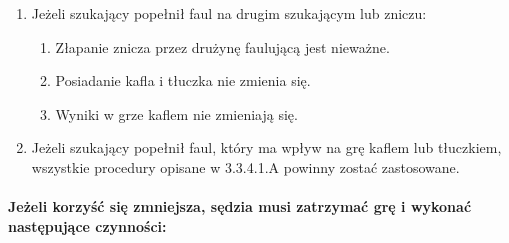 \documentclass[12pt]{article}
\begin{document}
\begin{enumerate}
	      \begin{enumerate}
		      \item
		            Jeżeli szukający popełnił faul na drugim szukającym lub zniczu:

		            \begin{enumerate}
			            \item
			                  Złapanie znicza przez drużynę faulującą jest nieważne.
			            \item
			                  Posiadanie kafla i tłuczka nie zmienia się.
			            \item
			                  Wyniki w grze kaflem nie zmieniają się.
		            \end{enumerate}
		      \item
		            Jeżeli szukający popełnił faul, który ma wpływ na grę kaflem lub
		            tłuczkiem, wszystkie procedury opisane w 3.3.4.1.A powinny zostać
		            zastosowane.
	      \end{enumerate}
\end{enumerate}

\paragraph{Jeżeli korzyść się zmniejsza, sędzia musi
	zatrzymać grę i wykonać następujące czynności:}
\end{document}
